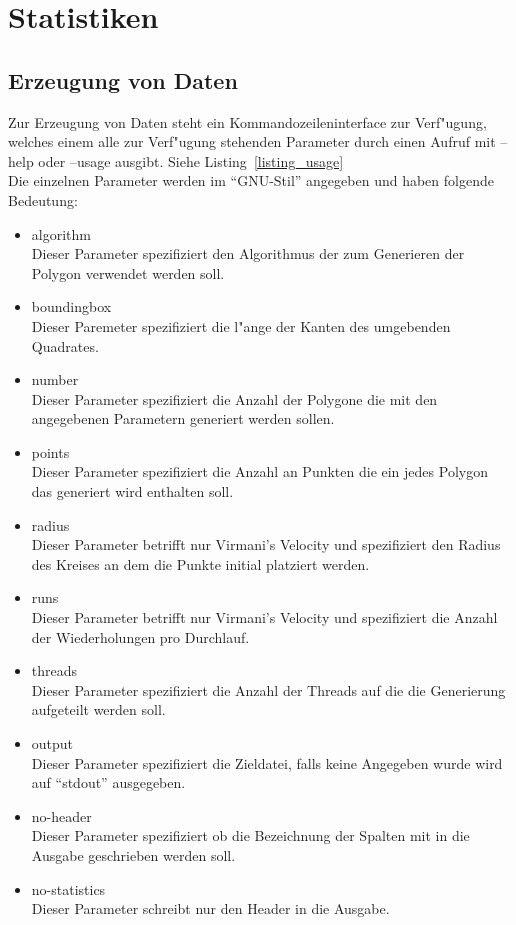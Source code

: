 \section{Statistiken}
  \subsection{Erzeugung von Daten}

    Zur Erzeugung von Daten steht ein Kommandozeileninterface zur Verf"ugung,
    welches einem alle zur Verf"ugung stehenden Parameter durch einen Aufruf
    mit --help oder --usage ausgibt. Siehe Listing~\ref{listing_usage}\\
    Die einzelnen Parameter werden im \enquote{GNU-Stil} angegeben und haben
    folgende Bedeutung:
    \begin{itemize}
      \item algorithm\\
        Dieser Parameter spezifiziert den Algorithmus der zum Generieren
        der Polygon verwendet werden soll.
      \item boundingbox\\
        Dieser Paremeter spezifiziert die l"ange der Kanten des umgebenden 
        Quadrates.
      \item number\\
        Dieser Parameter spezifiziert die Anzahl der Polygone die mit den 
        angegebenen Parametern generiert werden sollen.
      \item points\\
        Dieser Parameter spezifiziert die Anzahl an Punkten die ein
        jedes Polygon das generiert wird enthalten soll.
      \item radius\\
        Dieser Parameter betrifft nur Virmani's Velocity und spezifiziert den
        Radius des Kreises an dem die Punkte initial platziert werden.
      \item runs\\
        Dieser Parameter betrifft nur Virmani's Velocity und spezifiziert die
        Anzahl der Wiederholungen pro Durchlauf.
      \item threads\\
        Dieser Parameter spezifiziert die Anzahl der Threads auf die die 
        Generierung aufgeteilt werden soll.
      \item output\\
        Dieser Parameter spezifiziert die Zieldatei, falls keine Angegeben wurde
        wird auf \enquote{stdout} ausgegeben.
      \item no-header\\
        Dieser Parameter spezifiziert ob die Bezeichnung der Spalten mit in die
        Ausgabe geschrieben werden soll.
      \item no-statistics\\
        Dieser Parameter schreibt nur den Header in die Ausgabe.
    \end{itemize}
